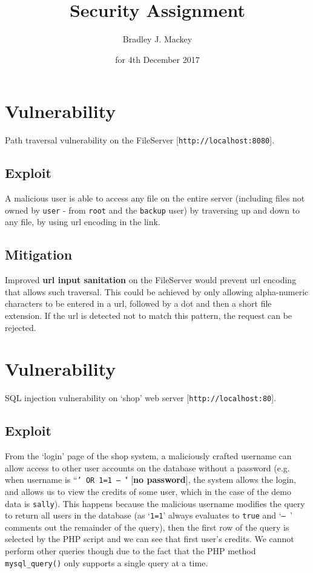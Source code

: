 \documentclass[11pt]{article}
\begin{document}
\title{\textbf{Security Assignment}}
\date{for 4th December 2017}
\author{Bradley J. Mackey}
\maketitle

\section{Vulnerability}

Path traversal vulnerability on the FileServer [\texttt{http://localhost:8080}].

\subsection{Exploit}

A malicious user is able to access any file on the entire server (including files not owned by \texttt{user} - from \texttt{root} and the \texttt{backup} user) by traversing up and down to any file, by using url encoding in the link.

\subsection{Mitigation}

Improved \textbf{url input sanitation} on the FileServer would prevent url encoding that allows such traversal. This could be achieved by only allowing alpha-numeric characters to be entered in a url, followed by a dot and then a short file extension. If the url is detected not to match this pattern, the request can be rejected.

\section{Vulnerability}

SQL injection vulnerability on `shop' web server [\texttt{http://localhost:80}].

\subsection{Exploit}

From the `login' page of the shop system, a maliciously crafted username can allow access to other user accounts on the database without a password (e.g. when username is ``\texttt{' OR 1=1 -- }" [\textbf{no password}], the system allows the login, and allows us to view the credits of some user, which in the case of the demo data is \texttt{sally}). This happens because the malicious username modifies the query to return all users in the database (as `\texttt{1=1}' always evaluates to \texttt{true} and `\texttt{-- }' comments out the remainder of the query), then the first row of the query is selected by the PHP script and we can see that first user's credits. We cannot perform other queries though due to the fact that the PHP method \texttt{mysql\_query()} only supports a single query at a time.
\end{document}
